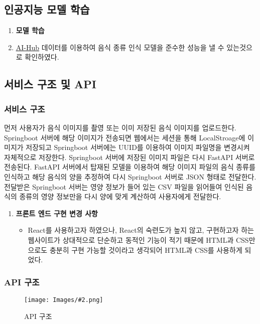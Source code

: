 \documentclass[10pt, a4paper]{article}
\newcommand{\tb}[1]{\textbf{#1}}
\newcommand{\img}[3][0.8]{
    \begin{figure}[tbh!]
    \begin{center}
    \texttt{[image: Images/\#2.png]}
    \end{center}
    \caption{#3}
    \label{fig:#3}
    \end{figure}}
\theoremstyle{definition}
\begin{document}
    \subsection{인공지능 모델 학습}\label{subsec:인공지능 모델 학습}
    \begin{enumerate}
        \item \tb{모델 학습}
        \item []  \textcolor{blue}{\underline{\href{https://www.aihub.or.kr/aihubdata/data/view.do?currMenu=115&topMenu=100&aihubDataSe=data&dataSetSn=74}{AI-Hub}}} 데이터를 이용하여 음식 종류 인식 모델을 준수한 성능을 낼 수 있는것으로 확인하였다.\\
    \end{enumerate}

    \subsection{서비스 구조 및 API}\label{subsec:서비스 구조 및 API}

    \subsubsection{서비스 구조}\label{subsubsec:서비스 구조}
    먼저 사용자가 음식 이미지를 촬영 또는 이미 저장된 음식 이미지를 업로드한다. Springboot 서버에 해당 이미지가 전송되면 웹에서는 세션을 통해 LocalStroage에 이미지가 저장되고 Springboot 서버에는 UUID를 이용하여 이미지 파일명을 변경시켜 자체적으로 저장한다. Springboot 서버에 저장된 이미지 파일은 다시 FastAPI 서버로 전송된다. FastAPI 서버에서 탑재된 모델을 이용하여 해당 이미지 파일의 음식 종류를 인식하고 해당 음식의 양을 추정하여 다시 Springboot 서버로 JSON 형태로 전달한다. 전달받은 Springboot 서버는 영양 정보가 들어 있는 CSV 파일을 읽어들여 인식된 음식의 종류의 영양 정보만을 다시 양에 맞게 계산하여 사용자에게 전달한다.

    \begin{enumerate}
        \item \tb{프론트 엔드 구현 변경 사항}
        \begin{itemize}
            \item React를 사용하고자 하였으나, React의 숙련도가 높지 않고, 구현하고자 하는 웹사이트가 상대적으로 단순하고 동적인 기능이 적기 때문에 HTML과 CSS만으로도 충분히 구현 가능할 것이라고 생각되어 HTML과 CSS를 사용하게 되었다.
        \end{itemize}
    \end{enumerate}

    \subsubsection{API 구조}\label{subsubsec:API 구조}
    \img[1.0]{API}{API 구조}
\end{document}
